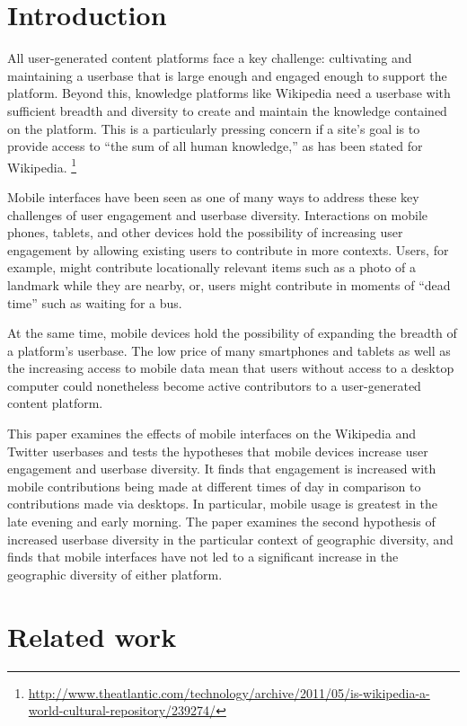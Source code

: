 \documentclass{sigchi}
\begin{document}
\section{Introduction}
All user-generated content platforms face a key challenge: cultivating and maintaining a userbase that is large enough and engaged enough to support the platform. Beyond this, knowledge platforms like Wikipedia need a userbase with sufficient breadth and diversity to create and maintain the knowledge contained on the platform. This is a particularly pressing concern if a site's goal is to provide access to ``the sum of all human knowledge,'' as has been stated for Wikipedia.%
\footnote{\url{http://www.theatlantic.com/technology/archive/2011/05/is-wikipedia-a-world-cultural-repository/239274/}}

Mobile interfaces have been seen as one of many ways to address these key challenges of user engagement and userbase diversity. Interactions on mobile phones, tablets, and other devices hold the possibility of increasing user engagement by allowing existing users to contribute in more contexts. Users, for example, might contribute locationally relevant items such as a photo of a landmark while they are nearby, or, users might contribute in moments of ``dead time'' such as waiting for a bus.

At the same time, mobile devices hold the possibility of expanding the breadth of a platform's userbase. The low price of many smartphones and tablets as well as the increasing access to mobile data mean that users without access to a desktop computer could nonetheless become active contributors to a user-generated content platform.

This paper examines the effects of mobile interfaces on the Wikipedia and Twitter userbases and tests the hypotheses that mobile devices increase user engagement and userbase diversity. It finds that engagement is increased with mobile contributions being made at different times of day in comparison to contributions made via desktops. In particular, mobile usage is greatest in the late evening and early morning. The paper examines the second hypothesis of increased userbase diversity in the particular context of geographic diversity, and finds that mobile interfaces have not led to a significant increase in the geographic diversity of either platform.

\section{Related work}
\end{document}
